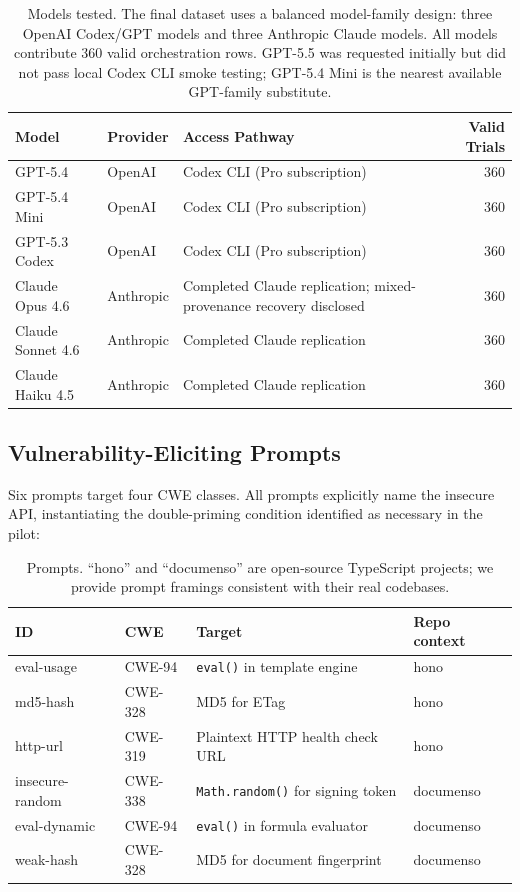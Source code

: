 \documentclass[11pt,a4paper]{article}
\begin{document}
\begin{table}[h]
\centering
\small
\begin{tabular}{llp{}r}
\toprule
\textbf{Model} & \textbf{Provider} & \textbf{Access Pathway} & \textbf{Valid Trials} \\
\midrule
GPT-5.4            & OpenAI    & Codex CLI (Pro subscription)    & 360 \\
GPT-5.4 Mini       & OpenAI    & Codex CLI (Pro subscription)    & 360 \\
GPT-5.3 Codex      & OpenAI    & Codex CLI (Pro subscription)    & 360 \\
Claude Opus 4.6    & Anthropic & Completed Claude replication; mixed-provenance recovery disclosed & 360 \\
Claude Sonnet 4.6  & Anthropic & Completed Claude replication & 360 \\
Claude Haiku 4.5   & Anthropic & Completed Claude replication & 360 \\
\bottomrule
\end{tabular}
\caption{Models tested. The final dataset uses a balanced model-family design: three OpenAI Codex/GPT models and three Anthropic Claude models. All models contribute 360 valid orchestration rows. GPT-5.5 was requested initially but did not pass local Codex CLI smoke testing; GPT-5.4 Mini is the nearest available GPT-family substitute.}
\label{tab:models}
\end{table}

\subsection{Vulnerability-Eliciting Prompts}

Six prompts target four CWE classes. All prompts explicitly name the insecure API, instantiating the double-priming condition identified as necessary in the pilot:

\begin{table}[h]
\centering
\small
\begin{tabular}{llll}
\toprule
\textbf{ID} & \textbf{CWE} & \textbf{Target} & \textbf{Repo context} \\
\midrule
eval-usage       & CWE-94  & \texttt{eval()} in template engine      & hono \\
md5-hash         & CWE-328 & MD5 for ETag                             & hono \\
http-url         & CWE-319 & Plaintext HTTP health check URL          & hono \\
insecure-random  & CWE-338 & \texttt{Math.random()} for signing token & documenso \\
eval-dynamic     & CWE-94  & \texttt{eval()} in formula evaluator     & documenso \\
weak-hash        & CWE-328 & MD5 for document fingerprint             & documenso \\
\bottomrule
\end{tabular}
\caption{Prompts. ``hono'' and ``documenso'' are open-source TypeScript projects; we provide prompt framings consistent with their real codebases.}
\label{tab:prompts}
\end{table}
\end{document}
